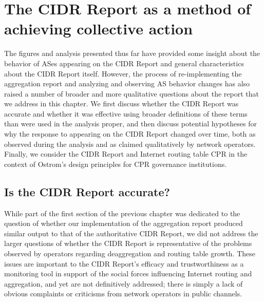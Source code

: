 \chapter{The CIDR Report as a method of achieving collective action}
\label{chap:discussion}

%

The figures and analysis presented thus far have provided some insight about
the behavior of ASes appearing on the CIDR Report and general characteristics
about the CIDR Report itself. However, the process of re-implementing the
aggregation report and analyzing and observing AS behavior changes has also
raised a number of broader and more qualitative questions about the report
that we address in this chapter. We first discuss whether the CIDR Report was
accurate and whether it was effective using broader definitions of these terms
than were used in the analysis proper, and then discuss potential hypotheses
for why the response to appearing on the CIDR Report changed over time, both as
observed during the analysis and as claimed qualitatively by network operators.
Finally, we consider the CIDR Report and Internet routing table CPR in the
context of Ostrom's design principles for CPR governance institutions.

\section{Is the CIDR Report accurate?}
While part of the first section of the previous chapter was dedicated to the
question of whether our implementation of the aggregation report produced
similar output to that of the authoritative CIDR Report, we did not address the
larger questions of whether the CIDR Report is representative of the problems
observed by operators regarding deaggregation and routing table growth. These
issues are important to the CIDR Report's efficacy and trustworthiness as a
monitoring tool in support of the social forces influencing Internet routing
and aggregation, and yet are not definitively addressed; there is simply a lack
of obvious complaints or criticisms from network operators in public channels.

